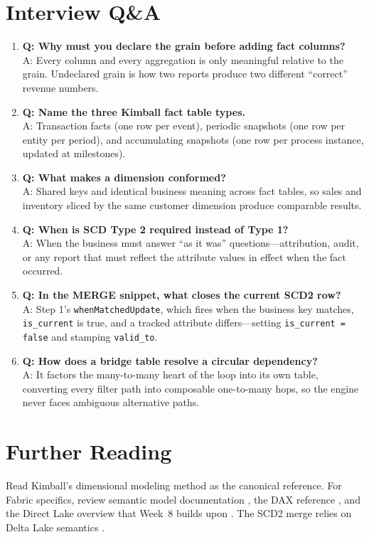 \section{Interview Q\&A}
\begin{enumerate}
    \item \textbf{Q: Why must you declare the grain before adding fact columns?}\\
    A: Every column and every aggregation is only meaningful relative to the grain. Undeclared grain is how two reports produce two different ``correct'' revenue numbers.
    \item \textbf{Q: Name the three Kimball fact table types.}\\
    A: Transaction facts (one row per event), periodic snapshots (one row per entity per period), and accumulating snapshots (one row per process instance, updated at milestones).
    \item \textbf{Q: What makes a dimension conformed?}\\
    A: Shared keys and identical business meaning across fact tables, so sales and inventory sliced by the same customer dimension produce comparable results.
    \item \textbf{Q: When is SCD Type 2 required instead of Type 1?}\\
    A: When the business must answer ``as it was'' questions---attribution, audit, or any report that must reflect the attribute values in effect when the fact occurred.
    \item \textbf{Q: In the MERGE snippet, what closes the current SCD2 row?}\\
    A: Step 1's \texttt{whenMatchedUpdate}, which fires when the business key matches, \texttt{is\_current} is true, and a tracked attribute differs---setting \texttt{is\_current = false} and stamping \texttt{valid\_to}.
    \item \textbf{Q: How does a bridge table resolve a circular dependency?}\\
    A: It factors the many-to-many heart of the loop into its own table, converting every filter path into composable one-to-many hops, so the engine never faces ambiguous alternative paths.
\end{enumerate}

\section{Further Reading}
Read Kimball's dimensional modeling method \cite{kimballToolkit} as the canonical reference. For Fabric specifics, review semantic model documentation \cite{microsoftFabricSemanticModels}, the DAX reference \cite{microsoftDax}, and the Direct Lake overview that Week~8 builds upon \cite{microsoftDirectLake}. The SCD2 merge relies on Delta Lake semantics \cite{deltaLakeDocs,armbrust2020delta}.

